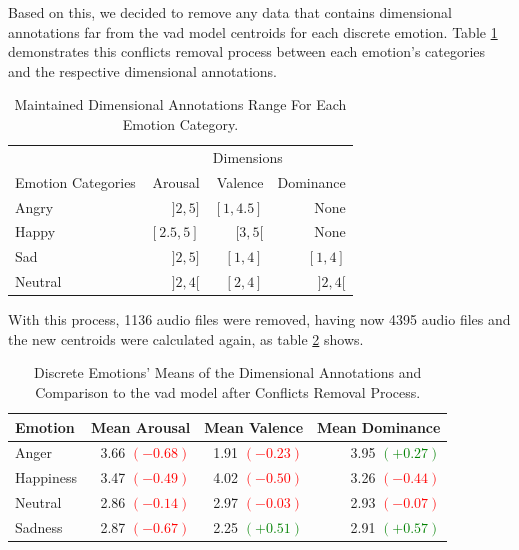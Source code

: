 Based on this, we decided to remove any data that contains dimensional annotations far from the \ac{vad} model centroids for each discrete emotion. Table \ref{tab:conf} demonstrates this conflicts removal process between each emotion's categories and the respective dimensional annotations.

\begin{table}[H]
\caption{Maintained Dimensional Annotations Range For Each Emotion Category.}
\label{tab:conf}
\centering
    \begin{tabular}{lrrr}
        \toprule
        {} & \multicolumn{3}{c}{Dimensions} \\ \cmidrule{2-4}
        Emotion Categories &    Arousal &      Valence &       Dominance \\
        \midrule
        Angry   &   $]2, 5]$  	& $[1, 4.5]$ 	&  None 		\\
        Happy 	&   $[2.5, 5]$  & $[3, 5[$ 		&  None 		\\
        Sad    	&   $]2, 5]$ 	& $[1, 4]$ 		&  $[1, 4]$ 	\\
        Neutral &   $]2, 4[$	& $[2, 4]$ 		&  $]2, 4[$		\\
        \bottomrule
    \end{tabular}
\end{table}


With this process, 1136 audio files were removed, having now 4395 audio files and the new centroids were calculated again, as table \ref{tab:new_c} shows.


\begin{table}[H]
	\centering
	\caption{Discrete Emotions' Means of the Dimensional Annotations and Comparison to the \ac{vad} model after Conflicts Removal Process.}
	\label{tab:new_c}
	\begin{tabular}{lrrr}
		\toprule
		Emotion & Mean Arousal &   Mean Valence & Mean Dominance \\
		\midrule
		Anger   	&   3.66 \textcolor{red}{$(-0.68)$} &  1.91 \textcolor{red}{$(-0.23)$} &  3.95 \textcolor{green}{$(+0.27)$} \\
		Happiness   &   3.47 \textcolor{red}{$(-0.49)$} &  4.02 \textcolor{red}{$(-0.50)$} &  3.26 \textcolor{red}{$(-0.44)$} \\
		Neutral 	&   2.86 \textcolor{red}{$(-0.14)$} &  2.97 \textcolor{red}{$(-0.03)$} &  2.93 \textcolor{red}{$(-0.07)$} \\
		Sadness     &   2.87 \textcolor{red}{$(-0.67)$} &  2.25 \textcolor{green}{$(+0.51)$} &  2.91 \textcolor{green}{$(+0.57)$} \\
		\bottomrule
	\end{tabular}
\end{table}


